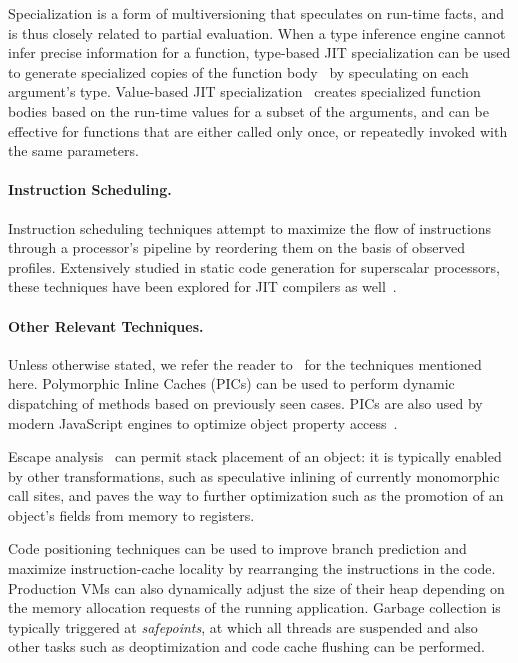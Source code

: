 Specialization is a form of multiversioning that speculates on run-time facts, and is thus closely related to partial evaluation. When a type inference engine cannot infer precise information for a function, type-based JIT specialization can be used to generate specialized copies of the function body~\cite{Cooper92} by speculating on each argument's type. Value-based JIT specialization~\cite{Santos13} creates specialized function bodies based on the run-time values for a subset of the arguments, and can be effective for functions that are either called only once, or repeatedly invoked with the same parameters.

\paragraph*{Instruction Scheduling.} Instruction scheduling techniques attempt to maximize the flow of instructions through a processor's pipeline by reordering them on the basis of observed profiles. Extensively studied in static code generation for superscalar processors, these techniques have been explored for JIT compilers as well~\cite{Arnold05, Touati14}.

\paragraph*{Other Relevant Techniques.} Unless otherwise stated, we refer the reader to~\cite{Arnold05} for the techniques mentioned here. Polymorphic Inline Caches (PICs) can be used to perform dynamic dispatching of methods based on previously seen cases. PICs are also used by modern JavaScript engines to optimize object property access~\cite{ChevalierBoisvert16}.

\noindent Escape analysis~\cite{Choi99} can permit stack placement of an object: it is typically enabled by other transformations, such as speculative inlining of currently monomorphic call sites, and paves the way to further optimization such as the promotion of an object's fields from memory to registers.

Code positioning techniques can be used to improve branch prediction and maximize instruction-cache locality by rearranging the instructions in the code. Production VMs can also dynamically adjust the size of their heap depending on the memory allocation requests of the running application. Garbage collection is typically triggered at {\em safepoints}, at which all threads are suspended and also other tasks such as deoptimization and code cache flushing can be performed.

